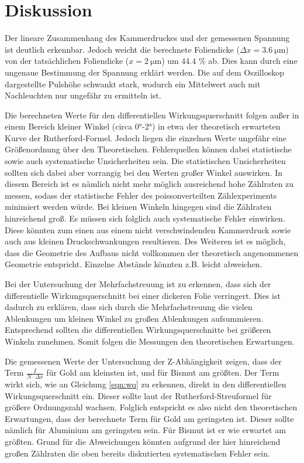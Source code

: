 \section{Diskussion}
\label{sec:Diskussion}
Der lineare Zusammenhang des Kammerdruckes und der gemessenen Spannung ist deutlich erkennbar. Jedoch weicht die
berechnete Foliendicke ($\Delta x = \SI{3.6}{\micro\meter}$) von der tatsächlichen Foliendicke ($x = \SI{2}{\micro\meter}$)
um $44.4$ \% ab. Dies kann durch eine ungenaue Bestimmung der Spannung erklärt werden. Die auf dem Oszilloskop
dargestellte Pulshöhe schwankt stark, wodurch ein Mittelwert auch mit Nachleuchten nur ungefähr zu ermitteln ist.



Die berechneten Werte für den differentiellen Wirkungsquerschnitt folgen außer in
einem Bereich kleiner Winkel (circa 0°-2°) in etwa der theoretisch erwarteten Kurve
der Rutherford-Formel. Jedoch liegen die einzelnen Werte ungefähr eine Größenordnung
über den Theoretischen. Fehlerquellen können dabei statistische sowie auch systematische
Unsicherheiten sein. Die statistischen Unsicherheiten sollten sich dabei aber vorrangig bei
den Werten großer Winkel auswirken. In diesem Bereich ist es nämlich nicht mehr möglich
ausreichend hohe Zählraten zu messen, sodass der statistische Fehler des poissonverteilten
Zählexperiments minimiert werden würde. Bei kleinen Winkeln hingegen sind die Zählraten hinreichend
groß. Es müssen sich folglich auch systematische Fehler einwirken. Diese könnten
zum einen aus einem nicht verschwindenden Kammerdruck sowie auch aus kleinen Druckschwankungen
resultieren. Des Weiteren ist es möglich, dass die Geometrie des Aufbaus nicht vollkommen der
theoretisch angenommenen Geometrie entspricht. Einzelne Abstände könnten z.B. leicht abweichen.

Bei der Untersuchung der Mehrfachstreuung ist zu erkennen, dass sich der differentielle Wirkungsquerschnitt
bei einer dickeren Folie verringert. Dies ist dadurch zu erklären, dass sich durch die
Mehrfachstreuung die vielen Ablenkungen um kleinen Winkel zu großen Ablenkungen aufsummieren.
Entsprechend sollten die differentiellen Wirkungsquerschnitte bei größeren Winkeln zunehmen.
Somit folgen die Messungen den theoretischen Erwartungen.

Die gemessenen Werte der Untersuchung der Z-Abhängigkeit zeigen, dass der Term $\frac{I}{N\cdot \Delta x}$
für Gold am kleinsten ist, und für Bismut am größten. Der Term wirkt sich, wie an
Gleichung \ref{eqn:wq} zu erkennen, direkt in den differentiellen Wirkungsquerschnitt ein.
Dieser sollte laut der Rutherford-Streuformel für größere Ordnungszahl wachsen.
Folglich entspricht es also nicht den theoretischen Erwartungen, dass der berechnete
Term für Gold am geringsten ist. Dieser sollte nämlich für Aluminium am geringsten sein.
Für Bismut ist er wie erwartet am größten. Grund für die Abweichungen könnten aufgrund
der hier hinreichend großen Zählraten die oben bereits diskutierten systematischen
Fehler sein.
